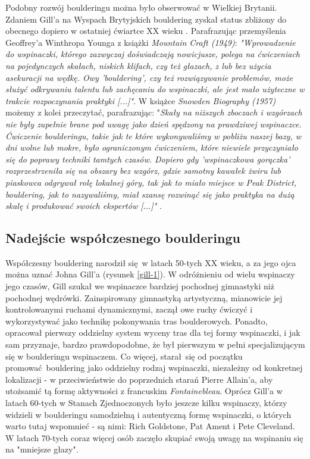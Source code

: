 \documentclass{article}
\begin{document}
Podobny rozwój boulderingu można było obserwować w Wielkiej Brytanii. Zdaniem Gill'a na Wyspach Brytyjskich bouldering zyskał status zbliżony do obecnego dopiero w ostatniej ćwiartce XX wieku \cite{gill-history-1.2}. Parafrazując przemyślenia Geoffrey'a Winthropa Younga z książki \textit{Mountain Craft (1949)}: \textit{"Wprowadzenie do wspinaczki, którego zazwyczaj doświadczają nowicjusze, polega na ćwiczeniach na pojedynczych skałach, niskich klifach, czy też głazach, z lub bez użycia asekuracji na wędkę. Owy 'bouldering', czy też rozwiązywanie problemów, może służyć odkrywaniu talentu lub zachęcaniu do wspinaczki, ale jest mało użyteczne w trakcie rozpoczynania praktyki [...]"}. W książce \textit{Snowden Biography (1957)} możemy z kolei przeczytać, parafrazując: "\textit{Skały na niższych zboczach i wzgórzach nie były zupełnie brane pod uwagę jako dzień spędzony na prawdziwej wspinaczce. Ćwiczenie boulderingu, takie jak te które wykonywaliśmy w pobliżu naszej bazy, w dni wolne lub mokre, było ograniczonym ćwiczeniem, które niewiele przyczyniało się do poprawy techniki tamtych czasów. Dopiero gdy 'wspinaczkowa gorączka' rozprzestrzeniła się na obszary bez wzgórz, gdzie samotny kawałek żwiru lub piaskowca odgrywał rolę lokalnej góry, tak jak to miało miejsce w Peak District, bouldering, jak to nazywaliśmy, miał szansę rozwinąć się jako praktyka na dużą skalę i produkować swoich ekspertów [...]"} \cite{gill-history-1.2}.

\subsection{Nadejście współczesnego boulderingu}
Współczesny bouldering narodził się w latach 50-tych XX wieku, a za jego ojca można uznać Johna Gill'a (rysunek \ref{gill-1}). W odróżnieniu od wielu wspinaczy jego czasów, Gill szukał we wspinaczce bardziej pochodnej gimnastyki niż pochodnej wędrówki. Zainspirowany gimnastyką artystyczną, mianowicie jej kontrolowanymi ruchami dynamicznymi, zaczął owe ruchy ćwiczyć i wykorzystywać jako technikę pokonywania tras boulderowych. Ponadto, opracował pierwszy oddzielny system wyceny tras dla tej formy wspinaczki, i jak sam przyznaje, bardzo prawdopodobne, że był pierwszym w pełni specjalizującym się w boulderingu wspinaczem. Co więcej, starał się od początku promować bouldering jako oddzielny rodzaj wspinaczki, niezależny od konkretnej lokalizacji - w przeciwieństwie do poprzednich starań Pierre Allain'a, aby utożsamić tą formę aktywności z francuskim \textit{Fontainebleau}. Oprócz Gill'a w latach 60-tych w Stanach Zjednoczonych było jeszcze kilku wspinaczy, którzy widzieli w boulderingu samodzielną i autentyczną formę wspinaczki, o których warto tutaj wspomnieć - są nimi: Rich Goldstone, Pat Ament i Pete Cleveland. W latach 70-tych coraz więcej osób zaczęło skupiać swoją uwagę na wspinaniu się na "mniejsze głazy".
\end{document}
